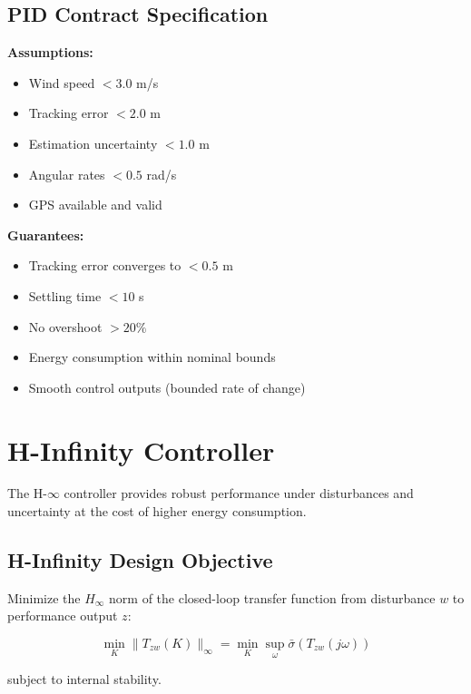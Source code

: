 \subsection{PID Contract Specification}

\begin{contractbox}
\textbf{Assumptions:}
\begin{itemize}
    \item Wind speed $< 3.0$ m/s
    \item Tracking error $< 2.0$ m
    \item Estimation uncertainty $< 1.0$ m
    \item Angular rates $< 0.5$ rad/s
    \item GPS available and valid
\end{itemize}

\textbf{Guarantees:}
\begin{itemize}
    \item Tracking error converges to $< 0.5$ m
    \item Settling time $< 10$ s
    \item No overshoot $> 20\%$
    \item Energy consumption within nominal bounds
    \item Smooth control outputs (bounded rate of change)
\end{itemize}
\end{contractbox}

\section{H-Infinity Controller}

The H-$\infty$ controller provides robust performance under disturbances and uncertainty at the cost of higher energy consumption.

\subsection{H-Infinity Design Objective}

Minimize the $H_\infty$ norm of the closed-loop transfer function from disturbance $w$ to performance output $z$:

\begin{equation}
    \min_K \|T_{zw}(K)\|_\infty = \min_K \sup_\omega \bar{\sigma}(T_{zw}(j\omega))
\end{equation}

subject to internal stability.


